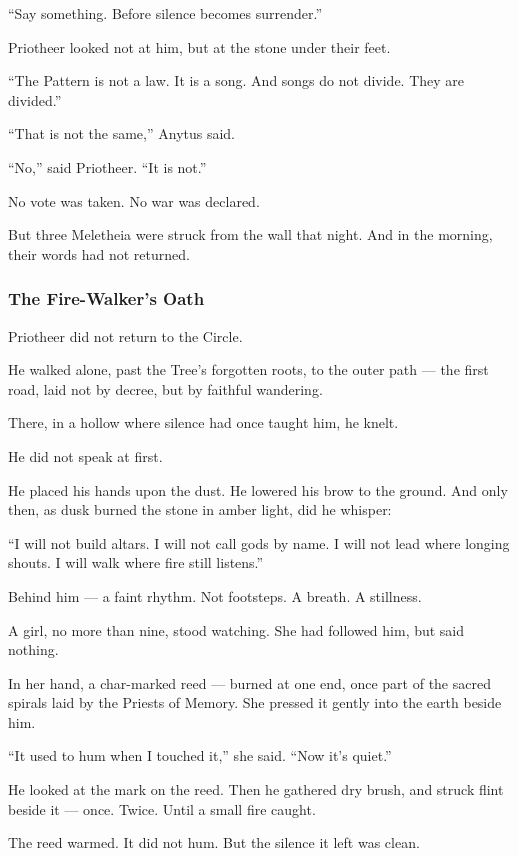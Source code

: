 \documentclass[12pt]{article}
\begin{document}
 “Say something. Before silence becomes surrender.”

Priotheer looked not at him,  
but at the stone under their feet.

 “The Pattern is not a law.  
 It is a song.  
 And songs do not divide.  
 They are divided.”

 “That is not the same,” Anytus said.

 “No,” said Priotheer. “It is not.”

No vote was taken.  
No war was declared.

But three Meletheia were struck from the wall that night.  
And in the morning, their words had not returned.

\dotfill

\subsubsection{The Fire-Walker's Oath}

Priotheer did not return to the Circle.

He walked alone, past the Tree’s forgotten roots,  
to the outer path — the first road, laid not by decree, but by faithful wandering.

There, in a hollow where silence had once taught him, he knelt.

He did not speak at first.

He placed his hands upon the dust.  
He lowered his brow to the ground.  
And only then, as dusk burned the stone in amber light, did he whisper:

 “I will not build altars.  
 I will not call gods by name.  
 I will not lead where longing shouts.  
 I will walk where fire still listens.”

Behind him — a faint rhythm.  
Not footsteps. A breath. A stillness.

A girl, no more than nine, stood watching.  
She had followed him, but said nothing.

In her hand, a char-marked reed — burned at one end,  
once part of the sacred spirals laid by the Priests of Memory.  
She pressed it gently into the earth beside him.

 “It used to hum when I touched it,” she said.  
 “Now it’s quiet.”

He looked at the mark on the reed.  
Then he gathered dry brush,  
and struck flint beside it —  
once.  
Twice.  
Until a small fire caught.

The reed warmed.  
It did not hum.  
But the silence it left was clean.
\end{document}
